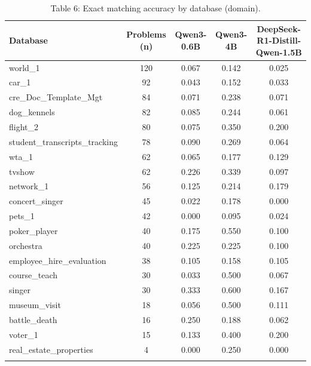 \documentclass[11pt]{article}
\begin{document}
\begin{table}[H]
\centering
\footnotesize
\caption{Table 6: Exact matching accuracy by database (domain).}
\begin{tabular}{lcccc}
\toprule
Database & Problems (n) & Qwen3-0.6B & Qwen3-4B & DeepSeek-R1-Distill-Qwen-1.5B \\
\midrule
world\_1 & 120 & 0.067 & 0.142 & 0.025 \\
car\_1 & 92 & 0.043 & 0.152 & 0.033 \\
cre\_Doc\_Template\_Mgt & 84 & 0.071 & 0.238 & 0.071 \\
dog\_kennels & 82 & 0.085 & 0.244 & 0.061 \\
flight\_2 & 80 & 0.075 & 0.350 & 0.200 \\
student\_transcripts\_tracking & 78 & 0.090 & 0.269 & 0.064 \\
wta\_1 & 62 & 0.065 & 0.177 & 0.129 \\
tvshow & 62 & 0.226 & 0.339 & 0.097 \\
network\_1 & 56 & 0.125 & 0.214 & 0.179 \\
concert\_singer & 45 & 0.022 & 0.178 & 0.000 \\
pets\_1 & 42 & 0.000 & 0.095 & 0.024 \\
poker\_player & 40 & 0.175 & 0.550 & 0.100 \\
orchestra & 40 & 0.225 & 0.225 & 0.100 \\
employee\_hire\_evaluation & 38 & 0.105 & 0.158 & 0.105 \\
course\_teach & 30 & 0.033 & 0.500 & 0.067 \\
singer & 30 & 0.333 & 0.600 & 0.167 \\
museum\_visit & 18 & 0.056 & 0.500 & 0.111 \\
battle\_death & 16 & 0.250 & 0.188 & 0.062 \\
voter\_1 & 15 & 0.133 & 0.400 & 0.200 \\
real\_estate\_properties & 4 & 0.000 & 0.250 & 0.000 \\
\bottomrule
\label{tab:exact-acc-rq1-by-database}
\end{tabular}
\end{table}
\end{document}
